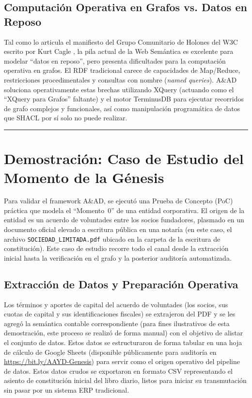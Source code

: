 \documentclass[12pt, a4paper]{article}
\begin{document}
\subsection{Computación Operativa en Grafos vs. Datos en Reposo}
Tal como lo articula el manifiesto del Grupo Comunitario de Holones del W3C escrito por Kurt Cagle \cite{cagle2025}, la pila actual de la Web Semántica es excelente para modelar ``datos en reposo'', pero presenta dificultades para la computación operativa en grafos. El RDF tradicional carece de capacidades de Map/Reduce, restricciones procedimentales y consultas con nombre (\textit{named queries}). A\&AD soluciona operativamente estas brechas utilizando XQuery (actuando como el ``XQuery para Grafos'' faltante) y el motor TerminusDB para ejecutar recorridos de grafo complejos y funcionales, así como manipulación programática de datos que SHACL por sí solo no puede realizar.

\hrule
\vspace{1em}

\section{Demostración: Caso de Estudio del Momento de la Génesis}

Para validar el framework A\&AD, se ejecutó una Prueba de Concepto (PoC) práctica que modela el ``Momento~0'' de una entidad corporativa. El origen de la entidad es un acuerdo de voluntades entre los socios fundadores, plasmado en un documento oficial elevado a escritura pública en una notaría (en este caso, el archivo \texttt{SOCIEDAD\_LIMITADA.pdf} ubicado en la carpeta de la escritura de constitución). Este caso de estudio recorre todo el canal desde la extracción inicial hasta la verificación en el grafo y la posterior auditoría automatizada.

\subsection{Extracción de Datos y Preparación Operativa}
Los términos y aportes de capital del acuerdo de voluntades (los socios, sus cuotas de capital y sus identificaciones fiscales) se extrajeron del PDF y se les agregó la semántica contable correspondiente (para fines ilustrativos de esta demostración, este proceso se realizó de forma manual) con el objetivo de alistar el conjunto de datos. Estos datos se estructuraron de forma tabular en una hoja de cálculo de Google Sheets (disponible públicamente para auditoría en \url{https://bit.ly/AAYD-Genesis}) para servir como el origen operativo del pipeline de datos. Estos datos crudos se exportaron en formato CSV representando el asiento de constitución inicial del libro diario, listos para iniciar su transmutación sin pasar por un sistema ERP tradicional.
\end{document}
